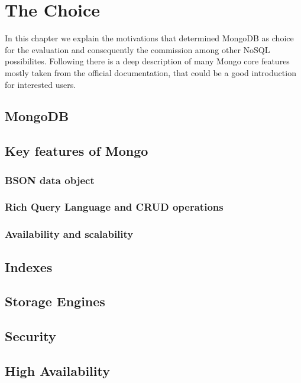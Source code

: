 \chapter{The Choice}
\label{cha:2}
In this chapter we explain the motivations that determined  MongoDB as choice for the evaluation and consequently the commission among other NoSQL possibilites.
Following there is a deep description of many Mongo core features mostly taken from the official documentation, that could be a good introduction for interested users.

\section{MongoDB}
\label{sec:1}

\section{Key features of Mongo}
\label{sec:2}


\subsection{BSON data object}

\subsection{Rich Query Language and CRUD operations}

\subsection {Availability and scalability}


\section{Indexes}
\label{sec:3}

\section{Storage Engines}
\label{sec:4}


\section{Security}
\label{sec:5}


\section{High Availability}
\label{sec:6}

